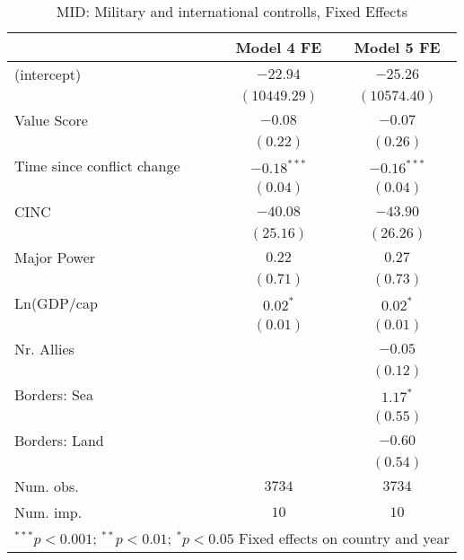
\begin{table}
\begin{center}
\begin{tabular}{l c c}
\toprule
 & Model 4 FE & Model 5 FE \\
\midrule
(intercept)                & $-22.94$      & $-25.26$      \\
                           & $(10449.29)$  & $(10574.40)$  \\
Value Score                & $-0.08$       & $-0.07$       \\
                           & $(0.22)$      & $(0.26)$      \\
Time since conflict change & $-0.18^{***}$ & $-0.16^{***}$ \\
                           & $(0.04)$      & $(0.04)$      \\
CINC                       & $-40.08$      & $-43.90$      \\
                           & $(25.16)$     & $(26.26)$     \\
Major Power                & $0.22$        & $0.27$        \\
                           & $(0.71)$      & $(0.73)$      \\
Ln(GDP/cap                 & $0.02^{*}$    & $0.02^{*}$    \\
                           & $(0.01)$      & $(0.01)$      \\
Nr. Allies                 &               & $-0.05$       \\
                           &               & $(0.12)$      \\
Borders: Sea               &               & $1.17^{*}$    \\
                           &               & $(0.55)$      \\
Borders: Land              &               & $-0.60$       \\
                           &               & $(0.54)$      \\
\midrule
Num. obs.                  & $3734$        & $3734$        \\
Num. imp.                  & $10$          & $10$          \\
\bottomrule
\multicolumn{3}{l}{\scriptsize{$^{***}p<0.001$; $^{**}p<0.01$; $^{*}p<0.05$ 
 Fixed effects on country and year}}
\end{tabular}
\caption{MID: Military and international controlls, Fixed Effects}
\label{MID_2_FE}
\end{center}
\end{table}
